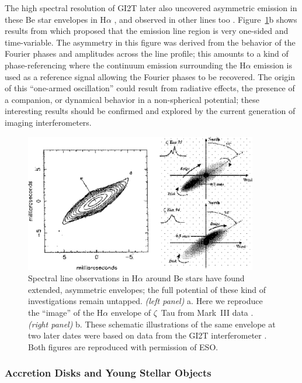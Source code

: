 \documentclass[12pt]{article}
\begin{document}
The high spectral resolution of GI2T later also uncovered asymmetric
emission in these Be star envelopes in H$\alpha$ \citep{stee1995}, and
observed in other lines too \citep{stee1998}.  Figure~\ref{bestars}b
shows results from \citet{vakili1998} \citep[see also][]{berio1999}
which proposed that the emission line region is very one-sided and
time-variable.  The asymmetry in this figure was derived from the
behavior of the Fourier phases and amplitudes across the line profile;
this amounts to a kind of phase-referencing where the continuum
emission surrounding the H$\alpha$ emission is used as a reference
signal allowing the Fourier phases to be recovered.  The origin of this
``one-armed oscillation'' could result from radiative effects, the presence of
a companion, or dynamical behavior in a non-spherical potential; these
interesting results should be confirmed and explored by the
current generation of imaging interferometers.

\begin{figure}[tbhp]
\begin{center}
\includegraphics[clip,angle=0,width=4.0in]{Figures/JDM_bestars.eps}
\caption{\footnotesize 
  Spectral line observations in H$\alpha$ around Be stars have found
  extended, asymmetric envelopes; the full potential of these kind of
  investigations remain untapped. {\em (left panel)} a. Here we reproduce
  the ``image'' of the H$\alpha$ envelope of $\zeta$~Tau from Mark~III
  data \citep[Figure 3 from][]{quirrenbach1994}.  {\em (right panel)} b.
  These schematic illustrations of the same envelope at two later
  dates were based on data from the GI2T interferometer \citep[see
  Figure~4 from][]{vakili1998}.  Both figures are reproduced with
  permission of ESO.
\label{bestars}}
\end{center}
\end{figure}



\subsubsection{Accretion Disks and Young Stellar Objects}
\end{document}
